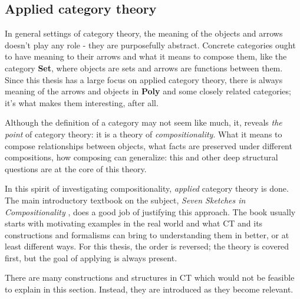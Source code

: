 
\subsection{Applied category theory}
In general settings of category theory, the meaning of the objects and arrows doesn't play any role - they are purposefully abstract. Concrete categories ought to have meaning to their arrows and what it means to compose them, like the category \textbf{Set}, where objects are sets and arrows are functions between them. Since this thesis has a large focus on applied category theory, there is always meaning of the arrows and objects in \textbf{Poly} and some closely related categories; it's what makes them interesting, after all.

Although the definition of a category may not seem like much, it, reveals \textit{the point} of category theory: it is a theory of \textit{compositionality}. What it means to compose relationships between objects, what facts are preserved under different compositions, how composing can generalize: this and other deep structural questions are at the core of this theory. 

In this spirit of investigating compositionality, \textit{applied} category theory is done. The main introductory textbook on the subject, \textit{Seven Sketches in Compositionality} \cite{seven-sketches}, does a good job of justifying this approach. The book usually starts with motivating examples in the real world and what CT and its constructions and formalisms can bring to understanding them in better, or at least different ways. For this thesis, the order is reversed; the theory is covered first, but the goal of applying is always present.

There are many constructions and structures in CT which would not be feasible to explain in this section. Instead, they are introduced as they become relevant.






